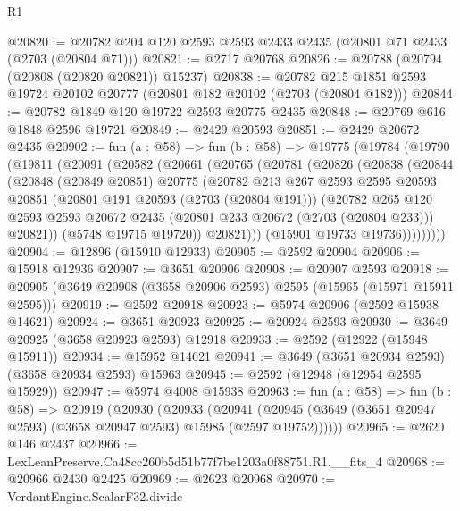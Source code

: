 \begin{lexlean}{R1}
\begin{coremodule}
@20820 := @20782 @204 @120 @2593 @2593 @2433 @2435 (@20801 @71 @2433 (@2703 (@20804 @71)))
@20821 := @2717 @20768
@20826 := @20788 (@20794 (@20808 (@20820 @20821)) @15237)
@20838 := @20782 @215 @1851 @2593 @19724 @20102 @20777 (@20801 @182 @20102 (@2703 (@20804 @182)))
@20844 := @20782 @1849 @120 @19722 @2593 @20775 @2435
@20848 := @20769 @616 @1848 @2596 @19721
@20849 := @2429 @20593
@20851 := @2429 @20672 @2435
@20902 := fun (a : @58) =>
  fun (b : @58) =>
  @19775
    (@19784
      (@19790
        (@19811
          (@20091
            (@20582
              (@20661
                (@20765
                  (@20781
                    (@20826
                      (@20838
                        (@20844
                          (@20848
                            (@20849 @20851)
                            @20775
                            (@20782
                              @213
                              @267
                              @2593
                              @2595
                              @20593
                              @20851
                              (@20801 @191 @20593 (@2703 (@20804 @191)))
                              (@20782
                                @265
                                @120
                                @2593
                                @2593
                                @20672
                                @2435
                                (@20801 @233 @20672 (@2703 (@20804 @233)))
                                @20821))
                            (@5748 @19715 @19720))
                          @20821)))
                    (@15901 @19733 @19736)))))))))
@20904 := @12896 (@15910 @12933)
@20905 := @2592 @20904
@20906 := @15918 @12936
@20907 := @3651 @20906
@20908 := @20907 @2593
@20918 := @20905 (@3649 @20908 (@3658 @20906 @2593) @2595 (@15965 (@15971 @15911 @2595)))
@20919 := @2592 @20918
@20923 := @5974 @20906 (@2592 @15938 @14621)
@20924 := @3651 @20923
@20925 := @20924 @2593
@20930 := @3649 @20925 (@3658 @20923 @2593) @12918
@20933 := @2592 (@12922 (@15948 @15911))
@20934 := @15952 @14621
@20941 := @3649 (@3651 @20934 @2593) (@3658 @20934 @2593) @15963
@20945 := @2592 (@12948 (@12954 @2595 @15929))
@20947 := @5974 @4008 @15938
@20963 := fun (a : @58) =>
  fun (b : @58) =>
  @20919
    (@20930
      (@20933
        (@20941 (@20945 (@3649 (@3651 @20947 @2593) (@3658 @20947 @2593) @15985 (@2597 @19752))))))
@20965 := @2620 @146 @2437
@20966 := LexLeanPreserve.Ca48cc260b5d51b77f7be1203a0f88751.R1.__fits_4
@20968 := @20966 @2430 @2425
@20969 := @2623 @20968
@20970 := VerdantEngine.ScalarF32.divide

\end{coremodule}
\end{lexlean}
